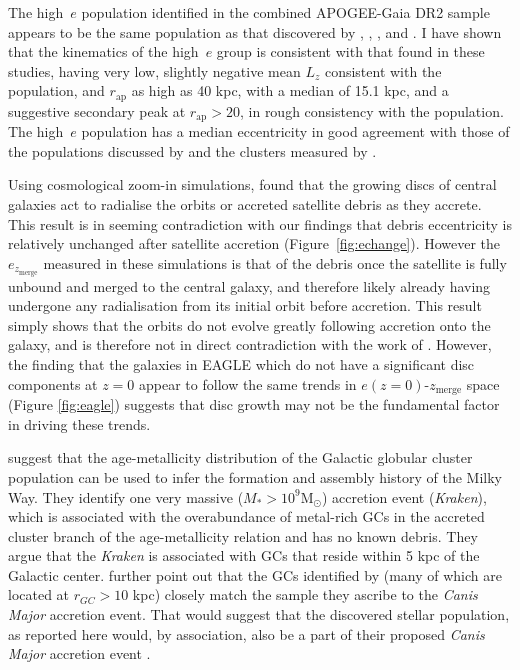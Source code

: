 The high~$e$ population identified in the combined APOGEE-Gaia DR2
sample appears to be the same population as that discovered by
\citet{2018MNRAS.478..611B}, \citet{2018arXiv180510288D},
\citet{2018arXiv180606038H}, and \citet{2018ApJ...863..113H}.  I
have shown that the kinematics of the high~$e$ group is consistent
with that found in these studies, having very low, slightly negative
mean $L_z$ consistent with the \citet{2018arXiv180606038H} population,
and $r_\mathrm{ap}$ as high as 40 kpc, with a median of 15.1 kpc,
and a suggestive secondary peak at $r_\mathrm{ap} > 20$, in rough
consistency with the \citet{2018arXiv180510288D} population. The
high~$e$ population has a median eccentricity in good agreement
with those of the populations discussed by \citet{2018MNRAS.478..611B}
and the clusters measured by \citet{2018arXiv180500453M}.

Using cosmological zoom-in simulations, \citet{2018MNRAS.478..611B}
found that the growing discs of central galaxies act to radialise
the orbits or accreted satellite debris as they accrete.
This result is in seeming contradiction with our findings that
debris eccentricity is relatively unchanged after satellite accretion
(Figure~\ref{fig:echange}). However
the $e_{z_\mathrm{merge}}$ measured in these simulations is that of the
debris once the satellite is fully unbound and merged to the central
galaxy, and therefore likely already having undergone any radialisation
from its initial orbit before accretion. This result simply shows that the
orbits do not evolve greatly following accretion onto the galaxy,
and is therefore not in direct contradiction with the work of
\citet{2018MNRAS.478..611B} \citep[or][who showed a similar effect
in an earlier study]{2017MNRAS.464.2882A}. However, the finding
that the galaxies in EAGLE which do not have a significant disc
components at $z=0$ appear to follow the same trends in
$e(z=0)$-$z_\mathrm{merge}$ space (Figure \ref{fig:eagle}) suggests
that disc growth may not be the fundamental factor in driving these
trends.

\citet{2018MNRAS.tmp.1537K} suggest that the age-metallicity
distribution of the Galactic globular cluster population can be
used to infer the formation and assembly history of the Milky Way.
They identify one very massive ($M_* > 10^9\mathrm{M_\odot}$)
accretion event (\emph{Kraken}), which is associated with the
overabundance of metal-rich GCs in the accreted cluster branch of
the age-metallicity relation and has no known debris. They
argue that the \emph{Kraken} is associated with GCs that reside
within 5 kpc of the Galactic center.  \citet{2018MNRAS.tmp.1537K}
further point out that the GCs identified by \citet{2018arXiv180500453M}
(many of which are located at $r_{GC}> 10$ kpc) closely match the sample
they ascribe to the \emph{Canis Major} accretion event.
That would suggest that the discovered stellar population, as reported here would, by association, also be a part of their proposed \emph{Canis
Major} accretion event \citep[as would also be the case of the
system identified by,
e.g.,][]{2018MNRAS.478..611B,2018ApJ...852...49H,2018arXiv180606038H,
2010A&A...511L..10N}. 

